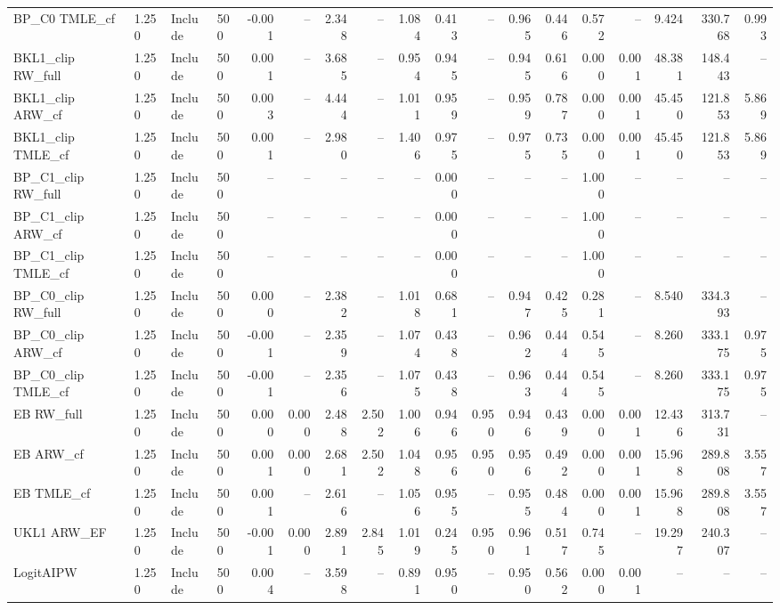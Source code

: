 \begin{tabular}{llllrrrrrrrrrrrrrr}
BP\_C0 TMLE\_cf & 1.250 & Include & 500 & -0.001 & -- & 2.348 & -- & 1.084 & 0.413 & -- & 0.965 & 0.446 & 0.572 & -- & 9.424 & 330.768 & 0.993 \\
BKL1\_clip RW\_full & 1.250 & Include & 500 & 0.001 & -- & 3.685 & -- & 0.954 & 0.945 & -- & 0.945 & 0.616 & 0.000 & 0.001 & 48.381 & 148.443 & -- \\
BKL1\_clip ARW\_cf & 1.250 & Include & 500 & 0.003 & -- & 4.444 & -- & 1.011 & 0.959 & -- & 0.959 & 0.787 & 0.000 & 0.001 & 45.450 & 121.853 & 5.869 \\
BKL1\_clip TMLE\_cf & 1.250 & Include & 500 & 0.001 & -- & 2.980 & -- & 1.406 & 0.975 & -- & 0.975 & 0.735 & 0.000 & 0.001 & 45.450 & 121.853 & 5.869 \\
BP\_C1\_clip RW\_full & 1.250 & Include & 500 & -- & -- & -- & -- & -- & 0.000 & -- & -- & -- & 1.000 & -- & -- & -- & -- \\
BP\_C1\_clip ARW\_cf & 1.250 & Include & 500 & -- & -- & -- & -- & -- & 0.000 & -- & -- & -- & 1.000 & -- & -- & -- & -- \\
BP\_C1\_clip TMLE\_cf & 1.250 & Include & 500 & -- & -- & -- & -- & -- & 0.000 & -- & -- & -- & 1.000 & -- & -- & -- & -- \\
BP\_C0\_clip RW\_full & 1.250 & Include & 500 & 0.000 & -- & 2.382 & -- & 1.018 & 0.681 & -- & 0.947 & 0.425 & 0.281 & -- & 8.540 & 334.393 & -- \\
BP\_C0\_clip ARW\_cf & 1.250 & Include & 500 & -0.001 & -- & 2.359 & -- & 1.074 & 0.438 & -- & 0.962 & 0.444 & 0.545 & -- & 8.260 & 333.175 & 0.975 \\
BP\_C0\_clip TMLE\_cf & 1.250 & Include & 500 & -0.001 & -- & 2.356 & -- & 1.075 & 0.438 & -- & 0.963 & 0.444 & 0.545 & -- & 8.260 & 333.175 & 0.975 \\
EB RW\_full & 1.250 & Include & 500 & 0.000 & 0.000 & 2.488 & 2.502 & 1.006 & 0.946 & 0.950 & 0.946 & 0.439 & 0.000 & 0.001 & 12.436 & 313.731 & -- \\
EB ARW\_cf & 1.250 & Include & 500 & 0.001 & 0.000 & 2.681 & 2.502 & 1.048 & 0.956 & 0.950 & 0.956 & 0.492 & 0.000 & 0.001 & 15.968 & 289.808 & 3.557 \\
EB TMLE\_cf & 1.250 & Include & 500 & 0.001 & -- & 2.616 & -- & 1.056 & 0.955 & -- & 0.955 & 0.484 & 0.000 & 0.001 & 15.968 & 289.808 & 3.557 \\
UKL1 ARW\_EF & 1.250 & Include & 500 & -0.001 & 0.000 & 2.891 & 2.845 & 1.019 & 0.245 & 0.950 & 0.961 & 0.517 & 0.745 & -- & 19.297 & 240.307 & -- \\
LogitAIPW & 1.250 & Include & 500 & 0.004 & -- & 3.598 & -- & 0.891 & 0.950 & -- & 0.950 & 0.562 & 0.000 & 0.001 & -- & -- & -- \\

\end{tabular}
